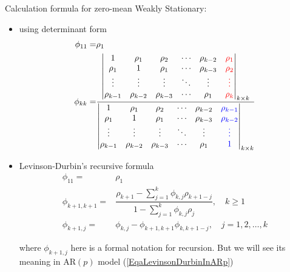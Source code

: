 \begin{itemize}[topsep=2pt,itemsep=0pt]
    
        Calculation formula for zero-mean Weakly Stationary:
        \begin{itemize}[topsep=2pt,itemsep=0pt]
            \item using determinant form
            \begin{align*}
            \phi _{11}=&\rho _1\\
            \phi _{kk}=&\dfrac{\begin{vmatrix}
                1&\rho _1&\rho _2&\cdots&\rho _{k-2}&{\color{red}\rho _1}\\
                \rho _1&1&\rho _1&\cdots&\rho _{k-3}&{\color{red}\rho _2}\\
                \vdots&\vdots&\vdots&\ddots&\vdots&{\color{red}\vdots}\\
                \rho _{k-1}&\rho _{k-2}&\rho _{k-3}&\cdots&\rho _1&{\color{red}\rho _k}
            \end{vmatrix}_{k\times k}}{\begin{vmatrix}
                1&\rho _1&\rho _2&\cdots&\rho _{k-2}&{\color{blue}\rho _{k-1}}\\
                \rho _1&1&\rho _1&\cdots&\rho _{k-3}&{\color{blue}\rho _{k-2}}\\
                \vdots&\vdots&\vdots&\ddots&\vdots&{\color{blue}\vdots}\\
                \rho _{k-1}&\rho _{k-2}&\rho _{k-3}&\cdots&\rho _1&{\color{blue}1}
            \end{vmatrix}_{k\times k}}
        \end{align*}
            
        \item Levinson-Durbin's recursive formula
        \begin{align}\label{EqaLevinsonDurbin}
            \phi _{11}=&\rho _1\\
            \phi _{k+1,k+1}=&\dfrac{\rho _{k+1}-\sum_{j=1}^k\phi _{k,j}\rho _{k+1-j}}{1-\sum_{j=1}^k\phi _{k,j}\rho _j},\quad k\geq 1\\
            \phi _{k+1,j}=&\phi _{k,j}-\phi _{k+1,k+1}\phi _{k,k+1-j},\quad j=1,2,\ldots,k
        \end{align}
        
        where $ \phi _{k+1,j} $ here is a formal notation for recursion. But we will see its meaning in AR$ (p) $ model (\autoref{EqaLevinsonDurbinInARp})
        
        
    \end{itemize}
        

\end{itemize}
